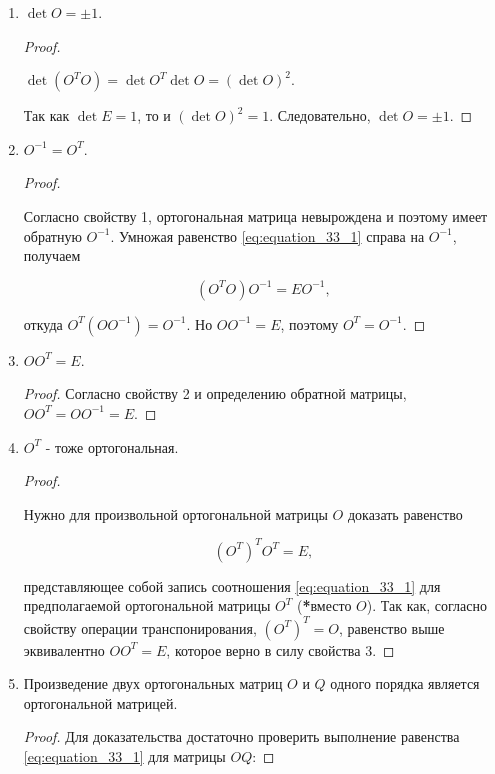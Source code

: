 \begin{enumerate}
    \item $\det O = \pm 1$.
    
    \begin{proof}~
    
        $\det(O^TO) = \det O^T \det O = (\det O)^2$.
        
        Так как $\det E = 1$, то и $(\det O)^2 = 1$. Следовательно, $\det O = \pm 1$.
    \end{proof}
    
    \item $O^{-1} = O^T$.

    \begin{proof}~
    
        Согласно свойству 1, ортогональная матрица невырождена и поэтому имеет обратную $O^{-1}$. Умножая равенство \eqref{eq:equation_33_1} справа на $O^{-1}$, получаем

        $$(O^TO)O^{-1} = EO^{-1},$$

        откуда $O^T(OO^{-1}) = O^{-1}$. Но $OO^{-1} = E$, поэтому $O^T = O^{-1}$.
    \end{proof}

    \item $OO^T = E$.

    \begin{proof}
        Согласно свойству 2 и определению обратной матрицы, $OO^T = OO^{-1} = E$.
    \end{proof}

    \item $O^T$ - тоже ортогональная.

    \begin{proof}~
    
        Нужно для произвольной ортогональной матрицы $O$ доказать равенство

        $$(O^T)^TO^T = E,$$

        представляющее собой запись соотношения \eqref{eq:equation_33_1} для предполагаемой ортогональной матрицы $O^T$ (\textbf{*}вместо $O$). Так как, согласно свойству операции транспонирования, $(O^T)^T = O$, равенство выше эквивалентно $OO^T = E$, которое верно в силу свойства 3.
    \end{proof}

    \item Произведение двух ортогональных матриц $O$ и $Q$ одного порядка является ортогональной матрицей.

    \begin{proof}
        Для доказательства достаточно проверить выполнение равенства \eqref{eq:equation_33_1} для матрицы $OQ$:


\end{proof}
\end{enumerate}
